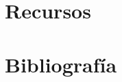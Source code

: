 \documentclass{perfil}
\begin{document}
\section{Recursos}




\newpage
\section{Bibliografía}


\end{document}
